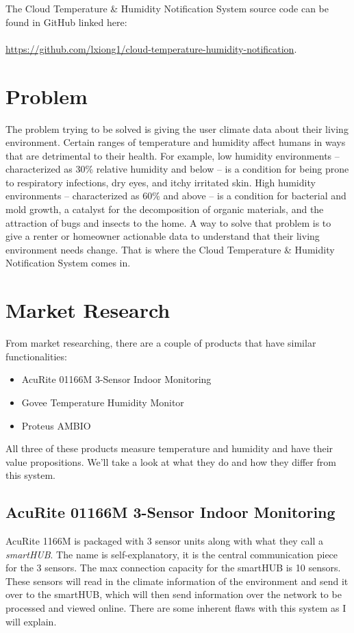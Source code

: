 \documentclass{article}
\begin{document}
The Cloud Temperature \& Humidity Notification System source code can be found in GitHub linked here: \\\\\url{https://github.com/lxiong1/cloud-temperature-humidity-notification}.

\section{Problem}
The problem trying to be solved is giving the user climate data about their living environment. Certain ranges of temperature and humidity affect humans in ways that are detrimental to their health. For example, low humidity environments --characterized as 30\% relative humidity and below -- is a condition for being prone to respiratory infections, dry eyes, and itchy irritated skin. High humidity environments -- characterized as 60\% and above -- is a condition for bacterial and mold growth, a catalyst for the decomposition of organic materials, and the attraction of bugs and insects to the home. A way to solve that problem is to give a renter or homeowner actionable data to understand that their living environment needs change. That is where the Cloud Temperature \& Humidity Notification System comes in.

\section{Market Research}
From market researching, there are a couple of products that have similar functionalities:

\begin{itemize}
    \item AcuRite 01166M 3-Sensor Indoor Monitoring
    \item Govee Temperature Humidity Monitor
    \item Proteus AMBIO
\end{itemize}

All three of these products measure temperature and humidity and have their value propositions. We'll take a look at what they do and how they differ from this system.

\subsection{AcuRite 01166M 3-Sensor Indoor Monitoring}
AcuRite 1166M is packaged with 3 sensor units along with what they call a \textit{smartHUB}. The name is self-explanatory, it is the central communication piece for the 3 sensors. The max connection capacity for the smartHUB is 10 sensors. These sensors will read in the climate information of the environment and send it over to the smartHUB, which will then send information over the network to be processed and viewed online. There are some inherent flaws with this system as I will explain.\\
\end{document}
